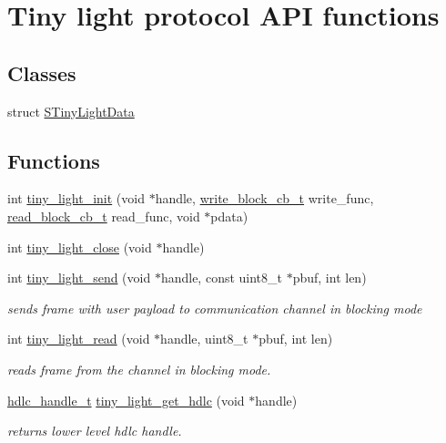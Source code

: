 \hypertarget{group__LIGHT__API}{}\section{Tiny light protocol A\+PI functions}
\label{group__LIGHT__API}
\subsection*{Classes}
\begin{DoxyCompactItemize}
\item 
struct \hyperlink{structSTinyLightData}{S\+Tiny\+Light\+Data}
\end{DoxyCompactItemize}
\subsection*{Functions}
\begin{DoxyCompactItemize}
\item 
int \hyperlink{group__LIGHT__API_ga221cf790724163d1aee89ad6a6c9a14d}{tiny\+\_\+light\+\_\+init} (void $\ast$handle, \hyperlink{tiny__types_8h_aafd634660bba76cace57a8f9b01e044d}{write\+\_\+block\+\_\+cb\+\_\+t} write\+\_\+func, \hyperlink{tiny__types_8h_a15bec127d9ee63658563d62e92b5261b}{read\+\_\+block\+\_\+cb\+\_\+t} read\+\_\+func, void $\ast$pdata)
\item 
int \hyperlink{group__LIGHT__API_ga6e045b8f4ef551c274fbacaa625e2748}{tiny\+\_\+light\+\_\+close} (void $\ast$handle)
\item 
int \hyperlink{group__LIGHT__API_ga12391f0d4c06fb6296b84fd4681a87f7}{tiny\+\_\+light\+\_\+send} (void $\ast$handle, const uint8\+\_\+t $\ast$pbuf, int len)
\begin{DoxyCompactList}\small\item\em sends frame with user payload to communication channel in blocking mode \end{DoxyCompactList}\item 
int \hyperlink{group__LIGHT__API_ga0181db79922917957779e1f2d740c407}{tiny\+\_\+light\+\_\+read} (void $\ast$handle, uint8\+\_\+t $\ast$pbuf, int len)
\begin{DoxyCompactList}\small\item\em reads frame from the channel in blocking mode. \end{DoxyCompactList}\item 
\hyperlink{struct__hdlc__handle__t}{hdlc\+\_\+handle\+\_\+t} \hyperlink{group__LIGHT__API_gabf582877977ecd57299d8675a1279e36}{tiny\+\_\+light\+\_\+get\+\_\+hdlc} (void $\ast$handle)
\begin{DoxyCompactList}\small\item\em returns lower level hdlc handle. \end{DoxyCompactList}\end{DoxyCompactItemize}



